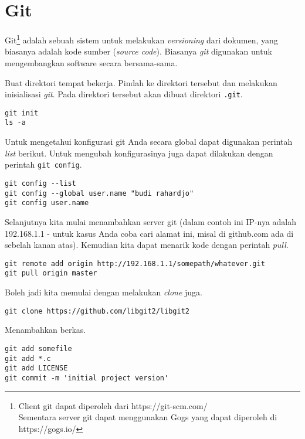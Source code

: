 \chapter{Git}
Git\footnote{Client git dapat diperoleh dari https://git-scm.com/\\
Sementara server git dapat menggunakan Gogs yang dapat diperoleh di
https://gogs.io/}
adalah sebuah sistem untuk melakukan {\em versioning} dari dokumen,
yang biasanya adalah kode sumber ({\em source code}).
Biasanya {\em git} digunakan untuk mengembangkan software secara bersama-sama.

Buat direktori tempat bekerja. Pindah ke direktori tersebut dan
melakukan inisialisasi {\em git}. 
Pada direktori tersebut akan dibuat direktori \texttt{.git}.

\begin{lstlisting}
git init
ls -a
\end{lstlisting}

Untuk mengetahui konfigurasi git Anda secara global dapat digunakan
perintah {\em list} berikut. Untuk mengubah konfigurasinya juga dapat
dilakukan dengan perintah \texttt{git config}.
\begin{lstlisting}
git config --list
git config --global user.name "budi rahardjo"
git config user.name
\end{lstlisting}

Selanjutnya kita mulai menambahkan server git (dalam contoh ini
IP-nya adalah 192.168.1.1 - untuk kasus Anda coba cari alamat ini,
misal di github.com ada di sebelah kanan atas).
Kemudian kita dapat menarik kode dengan perintah {\em pull}.

\begin{lstlisting}
git remote add origin http://192.168.1.1/somepath/whatever.git
git pull origin master
\end{lstlisting}

Boleh jadi kita memulai dengan melakukan {\em clone} juga.
\begin{lstlisting}
git clone https://github.com/libgit2/libgit2
\end{lstlisting}

Menambahkan berkas.

\begin{lstlisting}
git add somefile
git add *.c
git add LICENSE
git commit -m 'initial project version'
\end{lstlisting}
